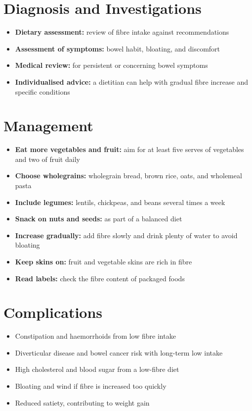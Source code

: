 \section*{Diagnosis and Investigations}
\begin{itemize}
    \item \textbf{Dietary assessment:} review of fibre intake against recommendations
    \item \textbf{Assessment of symptoms:} bowel habit, bloating, and discomfort
    \item \textbf{Medical review:} for persistent or concerning bowel symptoms
    \item \textbf{Individualised advice:} a dietitian can help with gradual fibre increase and specific conditions
\end{itemize}

\section*{Management}
\begin{itemize}
    \item \textbf{Eat more vegetables and fruit:} aim for at least five serves of vegetables and two of fruit daily
    \item \textbf{Choose wholegrains:} wholegrain bread, brown rice, oats, and wholemeal pasta
    \item \textbf{Include legumes:} lentils, chickpeas, and beans several times a week
    \item \textbf{Snack on nuts and seeds:} as part of a balanced diet
    \item \textbf{Increase gradually:} add fibre slowly and drink plenty of water to avoid bloating
    \item \textbf{Keep skins on:} fruit and vegetable skins are rich in fibre
    \item \textbf{Read labels:} check the fibre content of packaged foods
\end{itemize}

\section*{Complications}
\begin{itemize}
    \item Constipation and haemorrhoids from low fibre intake
    \item Diverticular disease and bowel cancer risk with long-term low intake
    \item High cholesterol and blood sugar from a low-fibre diet
    \item Bloating and wind if fibre is increased too quickly
    \item Reduced satiety, contributing to weight gain
\end{itemize}

